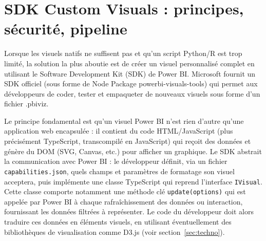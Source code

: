 \section{SDK Custom Visuals : principes, sécurité, pipeline}
\label{sec:sdk}

Lorsque les visuels natifs ne suffisent pas et qu’un script Python/R est trop limité, la solution la plus aboutie est de créer un visuel personnalisé complet en utilisant le Software Development Kit (SDK) de Power BI. Microsoft fournit un SDK officiel (sous forme de Node Package powerbi-visuals-tools) qui permet aux développeurs de coder, tester et empaqueter de nouveaux visuels sous forme d’un fichier .pbiviz\parencite{LearnMicrosoftSDK, PowerBIMicrosoftSDK}.

Le principe fondamental est qu’un visuel Power BI n’est rien d’autre qu’une application web encapsulée : il contient du code HTML/JavaScript (plus précisément TypeScript, transcompilé en JavaScript) qui reçoit des données et génère du DOM (SVG, Canvas, etc.) pour afficher un graphique. Le SDK abstrait la communication avec Power BI : le développeur définit, via un fichier \texttt{capabilities.json}, quels champs et paramètres de formatage son visuel acceptera, puis implémente une classe TypeScript qui reprend l’interface \texttt{IVisual}. Cette classe comporte notamment une méthode clé \texttt{update(options)} qui est appelée par Power BI à chaque rafraîchissement des données ou interaction, fournissant les données filtrées à représenter. Le code du développeur doit alors traduire ces données en éléments visuels, en utilisant éventuellement des bibliothèques de visualisation comme D3.js (voir section~\ref{sec:techno}).

